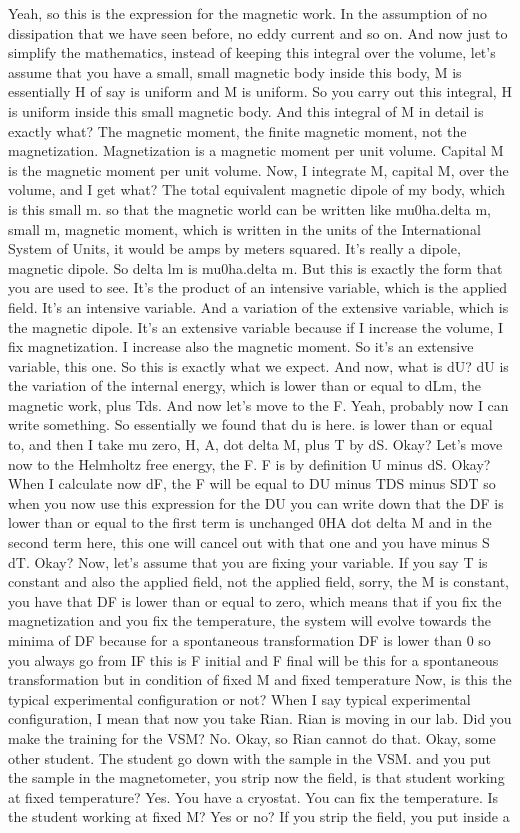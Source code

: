 Yeah, so this is the expression for the magnetic work. In the assumption of no dissipation that we have seen before, no eddy current and so on. And now just to simplify the mathematics, instead of keeping this integral over the volume, let's assume that you have a small, small magnetic body inside this body, M is essentially H of say is uniform and M is uniform. So you carry out this integral, H is uniform inside this small magnetic body. And this integral of M in detail is exactly what? The magnetic moment, the finite magnetic moment, not the magnetization. Magnetization is a magnetic moment per unit volume. Capital M is the magnetic moment per unit volume. Now, I integrate M, capital M, over the volume, and I get what? The total equivalent magnetic dipole of my body, which is this small m. so that the magnetic world can be written like mu0ha.delta m, small m, magnetic moment, which is written in the units of the International System of Units, it would be amps by meters squared. It's really a dipole, magnetic dipole. So delta lm is mu0ha.delta m. But this is exactly the form that you are used to see. It's the product of an intensive variable, which is the applied field. It's an intensive variable. And a variation of the extensive variable, which is the magnetic dipole. It's an extensive variable because if I increase the volume, I fix magnetization. I increase also the magnetic moment. So it's an extensive variable, this one. So this is exactly what we expect. And now, what is dU? dU is the variation of the internal energy, which is lower than or equal to dLm, the magnetic work, plus Tds. And now let's move to the F. Yeah, probably now I can write something. So essentially we found that du is here. is lower than or equal to, and then I take mu zero, H, A, dot delta M, plus T by dS. Okay? Let's move now to the Helmholtz free energy, the F. F is by definition U minus dS. Okay? When I calculate now dF, the F will be equal to DU minus TDS minus SDT so when you now use this expression for the DU you can write down that the DF is lower than or equal to the first term is unchanged 0HA dot delta M and in the second term here, this one will cancel out with that one and you have minus S dT. Okay? Now, let's assume that you are fixing your variable. If you say T is constant and also the applied field, not the applied field, sorry, the M is constant, you have that DF is lower than or equal to zero, which means that if you fix the magnetization and you fix the temperature, the system will evolve towards the minima of DF because for a spontaneous transformation DF is lower than 0 so you always go from IF this is F initial and F final will be this for a spontaneous transformation but in condition of fixed M and fixed temperature Now, is this the typical experimental configuration or not? When I say typical experimental configuration, I mean that now you take Rian. Rian is moving in our lab. Did you make the training for the VSM? No. Okay, so Rian cannot do that. Okay, some other student. The student go down with the sample in the VSM. and you put the sample in the magnetometer, you strip now the field, is that student working at fixed temperature? Yes. You have a cryostat. You can fix the temperature. Is the student working at fixed M? Yes or no? If you strip the field, you put inside a 